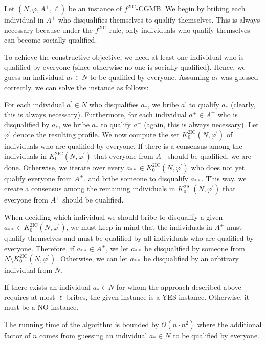 \documentclass[
    12pt,               %
    a4paper,            %
    bibtotoc,           %
    pointlessnumbers,   %
    ngerman,            %
    titlepage,          %
    leqno,              %
    ]{scrarticle}       %
\begin{document}
\begin{Proof}
Let $(N, \varphi, A^+, \ell)$ be an instance of $f^{\text{2IC}}$-CGMB. We begin by bribing each individual in $A^+$ who disqualifies themselves to qualify themselves. This is always necessary because under the $f^{\text{2IC}}$ rule, only individuals who qualify themselves can become socially qualified.

To achieve the constructive objective, we need at least one individual who is qualified by everyone (since otherwise no one is socially qualified). Hence, we guess an individual $a_\ast \in N$ to be qualified by everyone. Assuming $a_\ast$ was guessed correctly, we can solve the instance as follows:

For each individual $a^\prime \in N$ who disqualifies $a_\ast$, we bribe $a^\prime$ to qualify $a_\ast$ (clearly, this is always necessary). Furthermore, for each individual $a^+ \in A^+$ who is disqualified by $a_\ast$, we bribe $a_\ast$ to qualify $a^+$ (again, this is always necessary). Let $\varphi^\prime$ denote the resulting profile. We now compute the set $K^{\text{2IC}}_0(N, \varphi^\prime)$ of individuals who are qualified by everyone. If there is a consensus among the individuals in $K^{\text{2IC}}_0(N, \varphi^\prime)$ that everyone from $A^+$ should be qualified, we are done. Otherwise, we iterate over every $a_{\ast\ast} \in K^{\text{2IC}}_0(N, \varphi^\prime)$ who does not yet qualify everyone from $A^+$, and bribe someone to disqualify $a_{\ast\ast}$. This way, we create a consensus among the remaining individuals in $K^{\text{2IC}}_0(N, \varphi^\prime)$ that everyone from $A^+$ should be qualified.

When deciding which individual we should bribe to disqualify a given $a_{\ast\ast} \in K^{\text{2IC}}_0(N, \varphi^\prime)$, we must keep in mind that the individuals in $A^+$ must qualify themselves and must be qualified by all individuals who are qualified by everyone. Therefore, if $a_{\ast\ast} \in A^+$, we let $a_{\ast\ast}$ be disqualified by someone from $N \setminus K^{\text{2IC}}_0(N, \varphi^\prime)$. Otherwise, we can let $a_{\ast\ast}$ be disqualified by an arbitrary individual from $N$.

If there exists an individual $a_\ast \in N$ for whom the approach described above requires at most $\ell$ bribes, the given instance is a YES-instance. Otherwise, it must be a NO-instance.

The running time of the algorithm is bounded by $\mathcal{O}(n \cdot n^2)$ where the additional factor of $n$ comes from guessing an individual $a_\ast \in N$ to be qualified by everyone.
\end{Proof}
\end{document}
